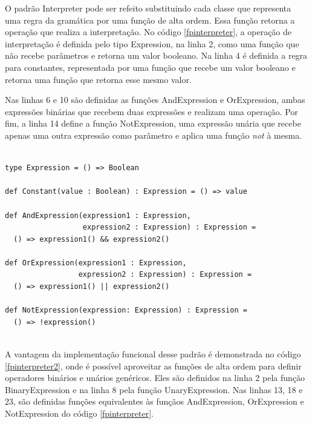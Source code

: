 O padrão Interpreter pode ser refeito substituindo 
cada classe que representa uma regra da gramática 
por uma função de alta ordem. Essa função retorna a 
operação que realiza a interpretação. No código 
\ref{fpinterpreter}, a operação de interpretação 
é definida pelo tipo Expression, na linha 2, como 
uma função que não recebe parâmetros e retorna um 
valor booleano. Na linha 4 é definida a regra para 
constantes, representada por uma função que recebe 
um valor booleano e retorna uma função que retorna 
esse mesmo valor.

Nas linhas 6 e 10 são definidas as funções 
AndExpression e OrExpression, ambas expressões 
binárias que recebem duas expressões e realizam 
uma operação. Por fim, a linha 14 define a função 
NotExpression, uma expressão unária que recebe 
apenas uma outra expressão como parâmetro e 
aplica uma função \textit{not} à mesma.

\begin{lstlisting}[caption={Interpreter Funcional},label=fpinterpreter]
    
type Expression = () => Boolean

def Constant(value : Boolean) : Expression = () => value
  
def AndExpression(expression1 : Expression,
                  expression2 : Expression) : Expression =
  () => expression1() && expression2()
  
def OrExpression(expression1 : Expression,
                 expression2 : Expression) : Expression =
  () => expression1() || expression2()
  
def NotExpression(expression: Expression) : Expression =
  () => !expression()
    
\end{lstlisting}

A vantagem da implementação funcional desse 
padrão é demonstrada no código \ref{fpinterpreter2}, 
onde é possível aproveitar as funções de alta 
ordem para definir operadores binários e unários 
genéricos. Eles são definidos na linha 2 pela função 
BinaryExpression e na linha 8 pela função 
UnaryExpression. Nas linhas 13, 18 e 23, são 
definidas funções equivalentes às funçãos 
AndExpression, OrExpression e NotExpression do 
código \ref{fpinterpreter}.

